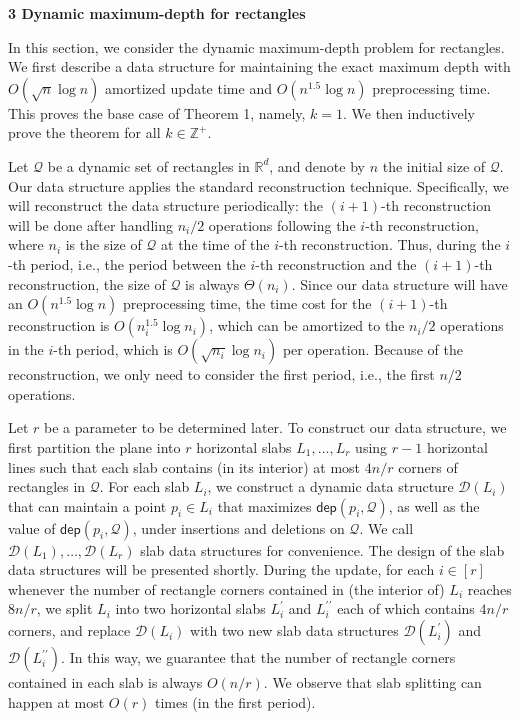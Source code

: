 \par\medskip\noindent\textbf{3 Dynamic maximum-depth for rectangles}\par
In this section, we consider the dynamic maximum-depth problem for rectangles. We first describe a data structure for maintaining the exact maximum depth with $O(\sqrt{n}\log n)$ amortized update time and $O(n^{1.5}\log n)$ preprocessing time. This proves the base case of Theorem 1, namely, $k=1$. We then inductively prove the theorem for all $k\in\mathbb{Z}^{+}$.
\par
\par
Let $\mathcal{Q}$ be a dynamic set of rectangles in $\mathbb{R}^{d}$, and denote by $n$ the initial size of $\mathcal{Q}$. Our data structure applies the standard reconstruction technique. Specifically, we will reconstruct the data structure periodically: the $(i+1)$-th reconstruction will be done after handling $n_{i}/2$ operations following the $i$-th reconstruction, where $n_{i}$ is the size of $\mathcal{Q}$ at the time of the $i$-th reconstruction. Thus, during the $i$-th period, i.e., the period between the $i$-th reconstruction and the $(i+1)$-th reconstruction, the size of $\mathcal{Q}$ is always $\Theta(n_{i})$. Since our data structure will have an $O(n^{1.5}\log n)$ preprocessing time, the time cost for the $(i+1)$-th reconstruction is $O(n_{i}^{1.5}\log n_{i})$, which can be amortized to the $n_{i}/2$ operations in the $i$-th period, which is $O(\sqrt{n_{i}}\log n_{i})$ per operation. Because of the reconstruction, we only need to consider the first period, i.e., the first $n/2$ operations.
\par
\par
Let $r$ be a parameter to be determined later. To construct our data structure, we first partition the plane into $r$ horizontal slabs $L_{1},\dots,L_{r}$ using $r-1$ horizontal lines such that each slab contains (in its interior) at most $4n/r$ corners of rectangles in $\mathcal{Q}$. For each slab $L_{i}$, we construct a dynamic data structure $\mathcal{D}(L_{i})$ that can maintain a point $p_{i}\in L_{i}$ that maximizes $\mathsf{dep}(p_{i},\mathcal{Q})$, as well as the value of $\mathsf{dep}(p_{i},\mathcal{Q})$, under insertions and deletions on $\mathcal{Q}$. We call $\mathcal{D}(L_{1}),\dots,\mathcal{D}(L_{r})$ slab data structures for convenience. The design of the slab data structures will be presented shortly. During the update, for each $i\in[r]$ whenever the number of rectangle corners contained in (the interior of) $L_{i}$ reaches $8n/r$, we split $L_{i}$ into two horizontal slabs $L_{i}^{\prime}$ and $L_{i}^{\prime\prime}$ each of which contains $4n/r$ corners, and replace $\mathcal{D}(L_{i})$ with two new slab data structures $\mathcal{D}(L_{i}^{\prime})$ and $\mathcal{D}(L_{i}^{\prime\prime})$. In this way, we guarantee that the number of rectangle corners contained in each slab is always $O(n/r)$. We observe that slab splitting can happen at most $O(r)$ times (in the first period).
